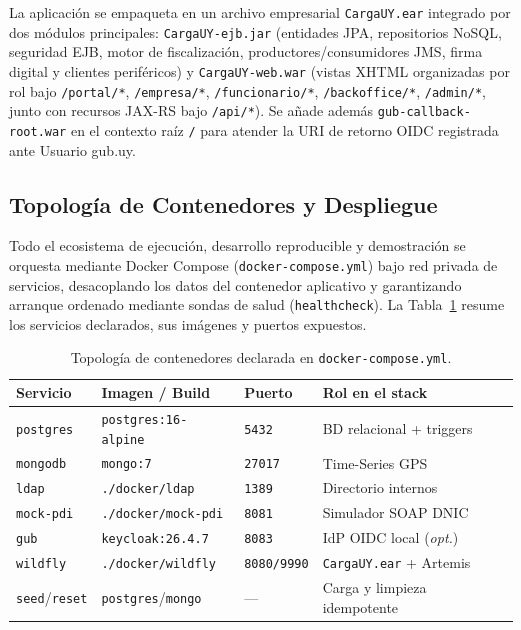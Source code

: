 \documentclass[11pt,a4paper,twocolumn]{article}
\begin{document}
La aplicación se empaqueta en un archivo empresarial \texttt{CargaUY.ear} integrado por dos módulos principales: \texttt{CargaUY-ejb.jar} (entidades JPA, repositorios NoSQL, seguridad EJB, motor de fiscalización, productores/consumidores JMS, firma digital y clientes periféricos) y \texttt{CargaUY-web.war} (vistas XHTML organizadas por rol bajo \texttt{/portal/*}, \texttt{/empresa/*}, \texttt{/funcionario/*}, \texttt{/backoffice/*}, \texttt{/admin/*}, junto con recursos JAX-RS bajo \texttt{/api/*}). Se añade además \texttt{gub-callback-root.war} en el contexto raíz \texttt{/} para atender la URI de retorno OIDC registrada ante Usuario gub.uy.

\subsection{Topología de Contenedores y Despliegue}\label{sec:contenedores}

Todo el ecosistema de ejecución, desarrollo reproducible y demostración se orquesta mediante Docker Compose (\texttt{docker-compose.yml}) bajo red privada de servicios, desacoplando los datos del contenedor aplicativo y garantizando arranque ordenado mediante sondas de salud (\texttt{healthcheck}). La Tabla~\ref{tab:contenedores} resume los servicios declarados, sus imágenes y puertos expuestos.

\begin{table}[t]
\centering
\caption{Topología de contenedores declarada en \texttt{docker-compose.yml}.}
\label{tab:contenedores}
\scriptsize
\begin{tabularx}{\columnwidth}{@{}lll>{\raggedright\arraybackslash}X@{}}
\toprule
\textbf{Servicio} & \textbf{Imagen / Build} & \textbf{Puerto} & \textbf{Rol en el stack} \\
\midrule
\texttt{postgres} & \texttt{postgres:16-alpine} & \texttt{5432} & BD relacional + triggers \\
\texttt{mongodb} & \texttt{mongo:7} & \texttt{27017} & Time-Series GPS \\
\texttt{ldap} & \texttt{./docker/ldap} & \texttt{1389} & Directorio internos \\
\texttt{mock-pdi} & \texttt{./docker/mock-pdi} & \texttt{8081} & Simulador SOAP DNIC \\
\texttt{gub} & \texttt{keycloak:26.4.7} & \texttt{8083} & IdP OIDC local (\textit{opt.}) \\
\texttt{wildfly} & \texttt{./docker/wildfly} & \texttt{8080/9990} & \texttt{CargaUY.ear} + Artemis \\
\texttt{seed}/\texttt{reset} & \texttt{postgres}/\texttt{mongo} & --- & Carga y limpieza idempotente \\
\bottomrule
\end{tabularx}
\end{table}
\end{document}
